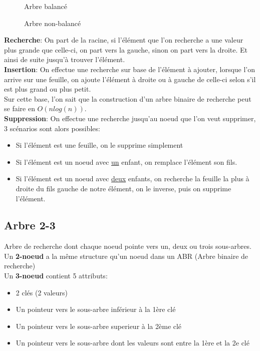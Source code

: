 \documentclass[10pt]{article}
\begin{document}
\begin{multicols}{2}
\begin{figure}[H]
\caption{Arbre balancé}
\label{fig:balanced_tree}
\end{figure}

\begin{figure}[H]
\caption{Arbre non-balancé}
\label{fig:unbalanced_tree}
\end{figure}
\end{multicols}
\textbf{Recherche}: On part de la racine, si l'élément que l'on recherche a une valeur plus grande que celle-ci, on part vers la gauche, sinon on part vers la droite. Et ainsi de suite jusqu'à trouver l'élément.
\\\textbf{Insertion}: On effectue une recherche sur base de l'élément à ajouter, lorsque l'on arrive sur une feuille, on ajoute l'élément à droite ou à gauche de celle-ci selon s'il est plus grand ou plus petit.\\
Sur cette base, l'on sait que la construction d'un arbre binaire de recherche peut se faire en $O(nlog(n))$.
\\\textbf{Suppression}: On effectue une recherche jusqu'au noeud que l'on veut supprimer, 3 scénarios sont alors possibles:
\begin{itemize}
\item Si l'élément est une feuille, on le supprime simplement
\item Si l'élément est un noeud avec \underline{un} enfant, on remplace l'élément son fils.
\item Si l'élément est un noeud avec \underline{deux} enfants, on recherche la feuille la plus à droite du fils gauche de notre élément, on le inverse, puis on supprime l'élément.
\end{itemize}

\subsection{Arbre 2-3}
Arbre de recherche dont chaque noeud pointe vers un, deux ou trois sous-arbres.\\
Un \textbf{2-noeud} a la même structure qu'un noeud dans un ABR (Arbre binaire de recherche)\\
Un \textbf{3-noeud} contient 5 attributs:
\begin{itemize}
\item 2 clés (2 valeurs)
\item Un pointeur vers le sous-arbre inférieur à la 1ère clé
\item Un pointeur vers le sous-arbre superieur à la 2ème clé
\item Un pointeur vers le sous-arbre dont les valeurs sont entre la 1ère et la 2e clé
\end{itemize}
\end{document}
